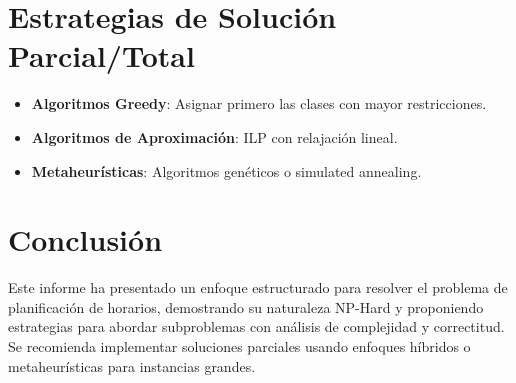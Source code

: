 \documentclass[12pt, a4paper]{article}
\begin{document}
\section{Estrategias de Solución Parcial/Total}
\begin{itemize}
    \item \textbf{Algoritmos Greedy}: Asignar primero las clases con mayor restricciones.
    \item \textbf{Algoritmos de Aproximación}: ILP con relajación lineal.
    \item \textbf{Metaheurísticas}: Algoritmos genéticos o simulated annealing.
\end{itemize}

\section{Conclusión}
Este informe ha presentado un enfoque estructurado para resolver el problema de planificación de horarios, demostrando su naturaleza NP-Hard y proponiendo estrategias para abordar subproblemas con análisis de complejidad y correctitud. Se recomienda implementar soluciones parciales usando enfoques híbridos o metaheurísticas para instancias grandes.
\end{document}
